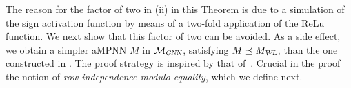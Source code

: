 The reason for the factor of two in (ii) in this Theorem is due to a simulation of the sign activation function by means of a two-fold application of the ReLu function. We next show that this factor of two can be avoided. As a side effect, we obtain a simpler aMPNN $M$ in $\mathcal{M}_{\textsl{GNN}}$, satisfying $M\preceq M_{\textsl{WL}}$, than the one constructed in \cite{grohewl}. The proof strategy is inspired by that of~\cite{grohewl}. Crucial in the proof the notion of \textit{row-independence modulo equality}, which we define next.

